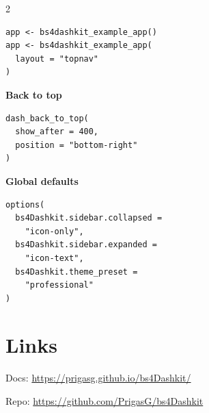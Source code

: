 \documentclass[10pt]{article}
\begin{document}
\begin{multicols}{2}
\begin{lstlisting}[style=rstyle]
app <- bs4dashkit_example_app()
app <- bs4dashkit_example_app(
  layout = "topnav"
)
\end{lstlisting}

\textbf{Back to top}

\begin{lstlisting}[style=rstyle]
dash_back_to_top(
  show_after = 400,
  position = "bottom-right"
)
\end{lstlisting}

\textbf{Global defaults}

\begin{lstlisting}[style=rstyle]
options(
  bs4Dashkit.sidebar.collapsed =
    "icon-only",
  bs4Dashkit.sidebar.expanded =
    "icon-text",
  bs4Dashkit.theme_preset =
    "professional"
)
\end{lstlisting}

\section*{Links}

Docs: \url{https://prigasg.github.io/bs4Dashkit/}

Repo: \url{https://github.com/PrigasG/bs4Dashkit}

\end{multicols}
\end{document}
